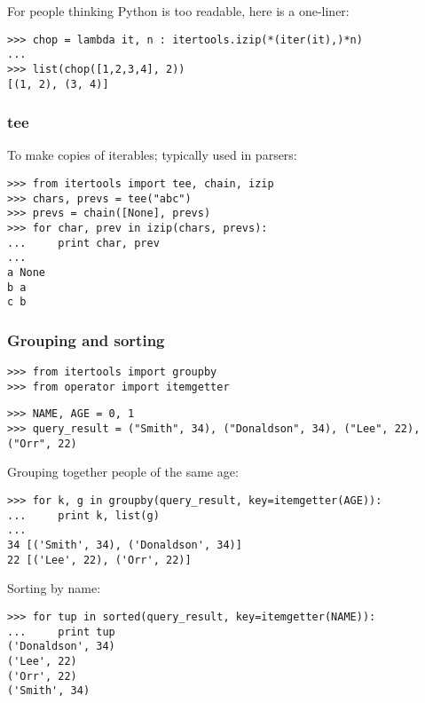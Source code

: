 \documentclass[10pt,a4paper,english]{article}
\begin{document}
For people thinking Python is too readable, here is a one-liner:
\begin{verbatim}>>> chop = lambda it, n : itertools.izip(*(iter(it),)*n)
...
>>> list(chop([1,2,3,4], 2))
[(1, 2), (3, 4)]\end{verbatim}



\hypertarget{tee}{}
\subsubsection*{tee}

To make copies of iterables; typically used in parsers:
\begin{verbatim}>>> from itertools import tee, chain, izip
>>> chars, prevs = tee("abc")
>>> prevs = chain([None], prevs)
>>> for char, prev in izip(chars, prevs):
...     print char, prev
...
a None
b a
c b\end{verbatim}



\hypertarget{grouping-and-sorting}{}
\subsubsection*{Grouping and sorting}
\begin{verbatim}>>> from itertools import groupby
>>> from operator import itemgetter\end{verbatim}
\begin{verbatim}>>> NAME, AGE = 0, 1
>>> query_result = ("Smith", 34), ("Donaldson", 34), ("Lee", 22), ("Orr", 22)\end{verbatim}

Grouping together people of the same age:
\begin{verbatim}>>> for k, g in groupby(query_result, key=itemgetter(AGE)):
...     print k, list(g)
...
34 [('Smith', 34), ('Donaldson', 34)]
22 [('Lee', 22), ('Orr', 22)]\end{verbatim}

Sorting by name:
\begin{verbatim}>>> for tup in sorted(query_result, key=itemgetter(NAME)):
...     print tup
('Donaldson', 34)
('Lee', 22)
('Orr', 22)
('Smith', 34)\end{verbatim}
\end{document}

